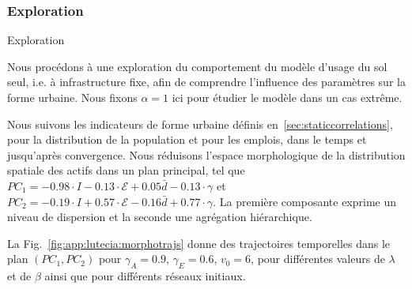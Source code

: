 \subsubsection{Exploration}{Exploration}


Nous procédons à une exploration du comportement du modèle d'usage du sol seul, i.e. à infrastructure fixe, afin de comprendre l'influence des paramètres sur la forme urbaine. Nous fixons $\alpha = 1$ ici pour étudier le modèle dans un cas extrême.

Nous suivons les indicateurs de forme urbaine définis en~\ref{sec:staticcorrelations}, pour la distribution de la population et pour les emplois, dans le temps et jusqu'après convergence. Nous réduisons l'espace morphologique de la distribution spatiale des actifs dans un plan principal, tel que $PC_1 = -0.98 \cdot I - 0.13 \cdot \mathcal{E} + 0.05 \bar{d} - 0.13 \cdot \gamma $ et $PC_2 = -0.19 \cdot I + 0.57 \cdot \mathcal{E} - 0.16 \bar{d} + 0.77 \cdot \gamma $. La première composante exprime un niveau de dispersion et la seconde une agrégation hiérarchique.


La Fig.~\ref{fig:app:lutecia:morphotrajs} donne des trajectoires temporelles dans le plan $(PC_1,PC_2)$ pour $\gamma_A = 0.9$, $\gamma_E = 0.6$, $v_0 = 6$, pour différentes valeurs de $\lambda$ et de $\beta$ ainsi que pour différents réseaux initiaux.




